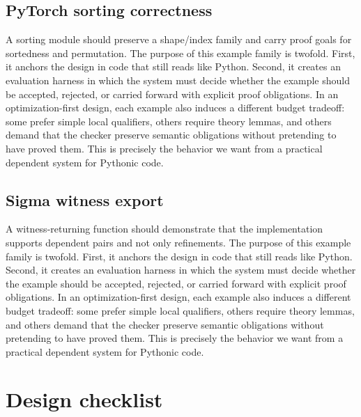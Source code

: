 \documentclass[11pt]{article}
\theoremstyle{definition}
\theoremstyle{plain}
\begin{document}
\subsection{PyTorch sorting correctness}
A sorting module should preserve a shape/index family and carry proof goals for sortedness and permutation.
The purpose of this example family is twofold. First, it anchors the design in
code that still reads like Python. Second, it creates an evaluation harness in
which the system must decide whether the example should be accepted, rejected,
or carried forward with explicit proof obligations. In an optimization-first
design, each example also induces a different budget tradeoff: some prefer
simple local qualifiers, others require theory lemmas, and others demand that
the checker preserve semantic obligations without pretending to have proved
them. This is precisely the behavior we want from a practical dependent system
for Pythonic code.

\subsection{Sigma witness export}
A witness-returning function should demonstrate that the implementation supports dependent pairs and not only refinements.
The purpose of this example family is twofold. First, it anchors the design in
code that still reads like Python. Second, it creates an evaluation harness in
which the system must decide whether the example should be accepted, rejected,
or carried forward with explicit proof obligations. In an optimization-first
design, each example also induces a different budget tradeoff: some prefer
simple local qualifiers, others require theory lemmas, and others demand that
the checker preserve semantic obligations without pretending to have proved
them. This is precisely the behavior we want from a practical dependent system
for Pythonic code.


\appendix
\section{Design checklist}
\end{document}
